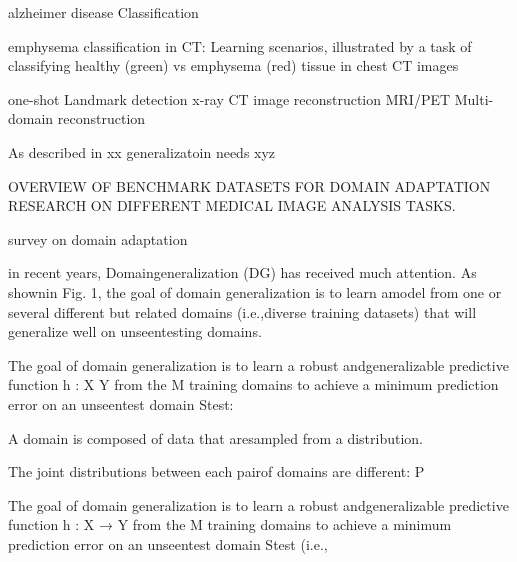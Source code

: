         \citep{wang2021harmonization} alzheimer disease Classification

        \citep{cheplygina2019not} emphysema classification in CT: Learning scenarios, illustrated by a task of classifying healthy (green) vs emphysema (red) tissue in chest CT images

        \citep{zhu2023uod} one-shot Landmark detection x-ray
        CT image reconstruction \citep{choi2023ct}
        MRI/PET Multi-domain reconstruction \citep{gautier2024bimodal}




        As described in xx generalizatoin needs xyz


        OVERVIEW OF BENCHMARK DATASETS FOR DOMAIN ADAPTATION RESEARCH ON DIFFERENT MEDICAL IMAGE ANALYSIS TASKS. \citep{guan2021domain}

        \citep{guan2021domain} survey on domain adaptation


        \citep{wang2022generalizing} in recent years, Domaingeneralization (DG) has received much attention. As shownin Fig. 1, the goal of domain generalization is to learn amodel from one or several different but related domains (i.e.,diverse training datasets) that will generalize well on unseentesting domains.

        The goal of domain generalization is to learn a robust andgeneralizable predictive function h : X  Y from the M training domains to achieve a minimum prediction error on an unseentest domain Stest:

        A domain is composed of data that aresampled from a distribution.

        The joint distributions between each pairof domains are different: P

        The goal of domain generalization is to learn a robust andgeneralizable predictive function h : X → Y from the M training
        domains to achieve a minimum prediction error on an unseentest domain Stest (i.e.,

        \citep{yang2024generalized}





